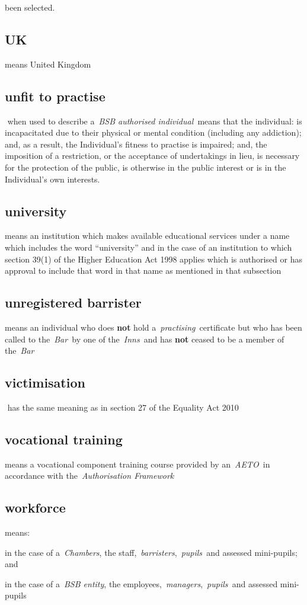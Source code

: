   been selected.
    \subsection{UK } means United Kingdom  \subsection{unfit to practise } when used to describe a~\emph{BSB
  authorised individual~}means that the individual: is incapacitated due
  to their physical or mental condition (including any addiction); and,
  as a result, the Individual's fitness to practise is impaired; and,
  the imposition of a restriction, or the acceptance of undertakings in
  lieu, is necessary for the protection of the public, is otherwise in
  the public interest or is in the Individual's own interests.  \subsection{university } means an institution which makes available
  educational services under a name which includes the word
  ``university'' and in the case of an institution to which section
  39(1) of the Higher Education Act 1998 applies which is authorised or
  has approval to include that word in that name as mentioned in that
  subsection  \subsection{unregistered barrister } means an individual who does \textbf{not}
  hold a~\emph{practising~}certificate but who has been called to
  the~\emph{Bar~}by one of the~\emph{Inns~}and has \textbf{not} ceased to be a
  member of the~\emph{Bar} 
  \subsection{victimisation } has the same meaning as in section 27 of the
  Equality Act 2010
    \subsection{vocational training } means a vocational component training
  course provided by an~\emph{AETO~}in accordance with
  the~\emph{Authorisation Framework} 
  
  \subsection{workforce } means: \al  \item in the case of a~\emph{Chambers}, the
  staff,~\emph{barristers},~\emph{pupils~}and assessed mini-pupils;
  and  \item in the case of a~\emph{BSB entity}, the
  employees,~\emph{managers},~\emph{pupils~}and assessed mini-pupils\la
  
